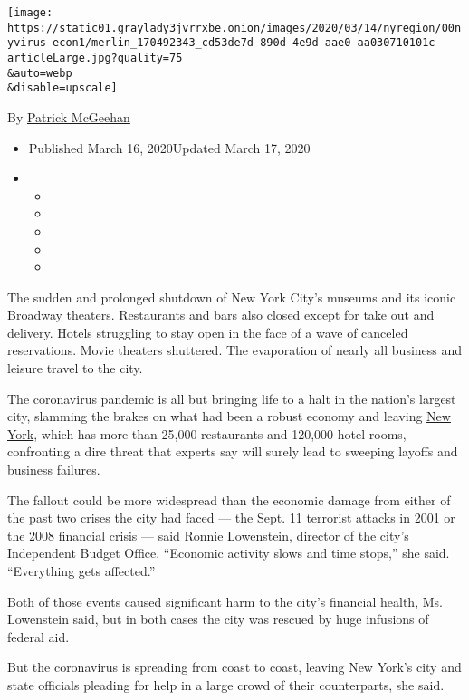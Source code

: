 \texttt{[image: https://static01.graylady3jvrrxbe.onion/images/2020/03/14/nyregion/00nyvirus-econ1/merlin\_170492343\_cd53de7d-890d-4e9d-aae0-aa030710101c-articleLarge.jpg?quality=75\\\&auto=webp\\\&disable=upscale]}

By \href{https://www.nytimes3xbfgragh.onion/by/patrick-mcgeehan}{Patrick
McGeehan}

\begin{itemize}
\item
  Published March 16, 2020Updated March 17, 2020
\item
  \begin{itemize}
  \item
  \item
  \item
  \item
  \item
  \end{itemize}
\end{itemize}

The sudden and prolonged shutdown of New York City's museums and its
iconic Broadway theaters.
\href{https://www.nytimes3xbfgragh.onion/2020/03/16/nyregion/nyc-closing-bars-restaurants-coronavirus.html}{Restaurants
and bars also closed} except for take out and delivery. Hotels
struggling to stay open in the face of a wave of canceled reservations.
Movie theaters shuttered. The evaporation of nearly all business and
leisure travel to the city.

The coronavirus pandemic is all but bringing life to a halt in the
nation's largest city, slamming the brakes on what had been a robust
economy and leaving
\href{https://www.nytimes3xbfgragh.onion/news-event/coronavirus-new-york}{New
York}, which has more than 25,000 restaurants and 120,000 hotel rooms,
confronting a dire threat that experts say will surely lead to sweeping
layoffs and business failures.

The fallout could be more widespread than the economic damage from
either of the past two crises the city had faced --- the Sept. 11
terrorist attacks in 2001 or the 2008 financial crisis --- said Ronnie
Lowenstein, director of the city's Independent Budget Office. ``Economic
activity slows and time stops,'' she said. ``Everything gets affected.''

Both of those events caused significant harm to the city's financial
health, Ms. Lowenstein said, but in both cases the city was rescued by
huge infusions of federal aid.

But the coronavirus is spreading from coast to coast, leaving New York's
city and state officials pleading for help in a large crowd of their
counterparts, she said.

